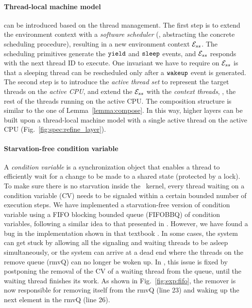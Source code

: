 \paragraph{Thread-local machine model}
can be introduced based on the thread management.
The first step is to 
extend the environment context
with a \emph{software scheduler} (\ie, abstracting the concrete
scheduling procedure), resulting in a new environment context $\mathcal{E}_{ss}$.
The scheduling primitives 
generate the ${\tiny \mathtt{yield}}$ and
${\tiny \mathtt{sleep}}$
events, and $\mathcal{E}_{ss}$ responds with the next
thread ID to execute.
One invariant we have to require on $\mathcal{E}_{ss}$
is that a sleeping thread can be rescheduled only after 
a ${\tiny \mathtt{wakeup}}$ event is generated.
The second step is to introduce
the \emph{active thread set}
to represent the target threads on the \emph{active CPU},
and extend the $\mathcal{E}_{ss}$
with the \emph{context threads},
\ie, the rest of the threads running on 
the active CPU. The composition structure is similar to the one of Lemma~\ref{lemma:compose}.
In this way,
higher layers can be built upon a thread-local machine model
with a single active thread on the active CPU
(\cf Fig.~\ref{fig:spec:refine_layer}).

\vspace{-3pt}
\paragraph{Starvation-free condition variable}
A \emph{condition variable} is a synchronization object
that enables a thread to efficiently wait for a change to be made 
to a shared state (protected by a lock). 
To make sure there is no starvation inside the \mCTOS\ kernel,
every thread waiting on a condition variable (CV) needs to be signaled within 
a certain bounded number of execution steps.
We have implemented a starvation-free version of condition variable
using a FIFO blocking bounded queue (FIFOBBQ) of condition variables,
following a similar idea to that presented in \cite[fig~5.14]{ospp11}.
However, we have found a bug in the implementation shown in that textbook \cite{anderson16}.
In some cases, the system can get stuck by allowing all the signaling and
waiting threads to be asleep simultaneously, or the system can arrive at
a dead end where the threads on the remove queue (rmvQ) can no longer be woken up.
In {\CTOS}, this issue is fixed by postponing the removal of
the CV of a waiting thread from the queue, until the waiting thread finishes its
work. As shown in Fig.~\ref{fig:exp:fifo}, the remover is now responsible
for removing itself from the rmvQ (line 23) and waking up the next element
in the rmvQ (line 26).

